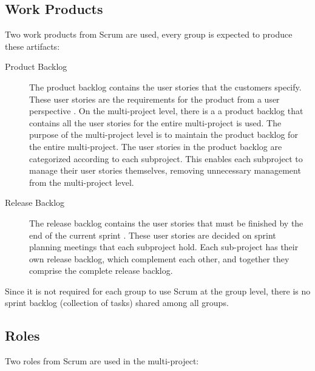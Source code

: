\subsection{Work Products}
Two work products from Scrum are used, every group is expected to produce these artifacts:

\begin{description}
  \item[Product Backlog] The product backlog contains the user stories that the customers specify. These user stories are the requirements for the product from a user perspective \parencite{larman2003}. On the multi-project level, there is a a product backlog that contains all the user stories for the entire multi-project is used. The purpose of the multi-project level is to maintain the product backlog for the entire multi-project. The user stories in the product backlog are categorized according to each subproject. This enables each subproject to manage their user stories themselves, removing unnecessary management from the multi-project level.
  \item[Release Backlog] The release backlog contains the user stories that must be finished by the end of the current sprint \parencite{larman2003}. These user stories are decided on sprint planning meetings that each subproject hold. Each sub-project has their own release backlog, which complement each other, and together they comprise the complete release backlog.
\end{description}

Since it is not required for each group to use Scrum at the group level, there is no sprint backlog (collection of tasks) shared among all groups.

\subsection{Roles}
Two roles from Scrum are used in the multi-project:

